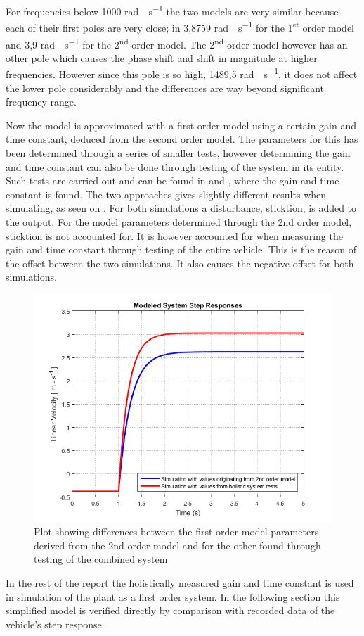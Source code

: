 %
For frequencies below 1000 \si{rad\cdot s^{-1}} the two models are very similar because each of their first poles are very close; in 3,8759 \si{rad\cdot s^{-1}} for the \si{1^{st}} order model and 3,9 \si{rad\cdot s^{-1}} for the \si{2^{nd}} order model. The \si{2^{nd}} order model however has an other pole which causes the phase shift and shift in magnitude at higher frequencies. However since this pole is so high, 1489,5 \si{rad\cdot s^{-1}}, it does not affect the lower pole considerably and the differences are way beyond significant frequency range.

Now the model is approximated with a first order model using a certain gain and time constant, deduced from the second order model. The parameters for this has been determined through a series of smaller tests, however determining the gain and time constant can also be done through testing of the system in its entity. Such tests are carried out and can be found in  and , where the gain and time constant is found.
The two approaches gives slightly different results when simulating, as seen on . For both simulations a disturbance, sticktion, is added to the output. For the model parameters determined through the 2nd order model, sticktion is not accounted for. It is however accounted for when measuring the gain and time constant through testing of the entire vehicle. This is the reason of the offset between the two simulations. It also causes the negative offset for both simulations.
%
\begin{figure}[H]
	\centering
	\includegraphics[width = \textwidth]{figures/ComparingFirstOrderModels.png}
	\caption{Plot showing differences between the first order model parameters, derived from the 2nd order model and for the other found through testing of the combined system}
	\label{fig:ComparingFirstOrderModels}
\end{figure}\vspace{-5mm}
%
In the rest of the report the holistically measured gain and time constant is used in simulation of the plant as a first order system. In the following section this simplified model is verified directly by comparison with recorded data of the vehicle's step response.